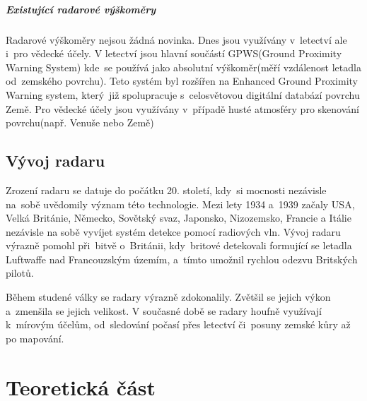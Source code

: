 	\paragraph{Existující radarové výškoměry}
	Radarové výškoměry nejsou žádná novinka. Dnes jsou využívány v~letectví ale i~pro vědecké účely.
	V letectví jsou hlavní součástí GPWS(Ground Proximity Warning System) kde~se používá jako absolutní výškoměr(měří vzdálenost letadla od~zemského povrchu). Teto systém byl rozšířen na Enhanced Ground Proximity Warning system, který~již spolupracuje s~celosvětovou digitální databází povrchu Země.
	Pro vědecké účely jsou využívány v~případě husté atmosféry pro skenování povrchu(např. Venuše nebo Země)
	
	\section{Vývoj radaru}
		Zrození radaru se datuje do počátku 20. století, kdy~si mocnosti nezávisle na~sobě uvědomily význam této technologie. Mezi lety 1934 a~1939 začaly USA, Velká Británie, Německo, Sovětský svaz, Japonsko, Nizozemsko, Francie a Itálie nezávisle na sobě vyvíjet systém detekce pomocí radiových vln.\cite{history::radar} Vývoj radaru výrazně pomohl při~bitvě o~Británii, kdy~britové detekovali formující se letadla Luftwaffe nad Francouzským územím, a~tímto umožnil rychlou odezvu Britských pilotů.\par
			
		Během studené války se radary výrazně zdokonalily. Zvětšil se jejich výkon a~zmenšila se jejich velikost. V současné době se radary houfně využívají k~mírovým účelům, od~sledování počasí přes letectví či~posuny zemské kůry až po mapování.
\chapter{Teoretická část}
	
